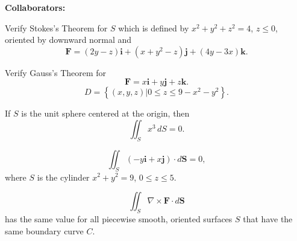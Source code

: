 \documentclass[11pt,letterpaper,boxed]{hmcpset}
\newcommand{\pn}[1]{\left( #1 \right)}
\newcommand{\crb}[1]{\left\{ #1 \right\}}
\newcommand{\VEC}[1]{\ensuremath{\mathbf{#1}}\xspace}
\begin{document}
\noindent\textbf{Collaborators:} 


\begin{problem}[Colley 7.3 \#4]
Verify Stokes's Theorem for $S$ which is defined by $x^2+y^2+z^2=4$, $z\leq0$, oriented by downward normal and 
\[
	\VEC{F} = (2y-z)\VEC{i}+(x+y^2-z)\VEC{j}+(4y-3x)\VEC{k}.
\]
\end{problem}

\begin{solution}
\vfill
\end{solution}
\newpage

\begin{problem}[Colley 7.3 \#6]
Verify Gauss's Theorem for
\[
	\VEC{F} = x\VEC{i}+y\VEC{j}+z\VEC{k}.
\]
\[
	D = \crb{(x,y,z)|0\leq z\leq9-x^2-y^2}.
\]
\end{problem}

\begin{solution}
\vfill
\end{solution}
\newpage

\begin{problem}[Colley 7.4  T/F \#6]
If $S$ is the unit sphere centered at the origin, then 
\[
	\iint_Sx^3\,dS=0.
\]
\end{problem}

\begin{solution}
\vfill
\end{solution}
\newpage

\begin{problem}[Colley 7.4 T/F \#10]
\[
	\iint_S\pn{-y\VEC{i}+x\VEC{j}}\cdot d\VEC{S}=0,
\]
 where $S$ is the cylinder $x^2+y^2=9$, $0\leq z\leq5.$
\end{problem}

\begin{solution}
\vfill
\end{solution}
\newpage

\begin{problem}[Colley 7.4 \#18	]
\[
	\iint_S\nabla\times\VEC{F}\cdot d\VEC{S}
\]
has the same value for all piecewise smooth, oriented surfaces $S$ that have the same boundary curve $C$.

\end{problem}

\begin{solution}
\vfill
\end{solution}
\newpage
\end{document}
